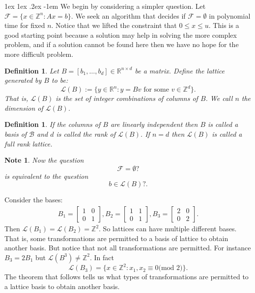 \documentclass[11pt]{article}
\makeatletter
\renewcommand\paragraph{\@startsection{paragraph}{4}{0mm}%
                                    {1ex \@plus1ex \@minus.2ex}%
                                    {-1em}%
                                    {\normalfont\normalsize\bfseries}}
\newtheorem{definition}[fact]{Definition}
\newtheorem{note}[fact]{Note}
\newcommand{\R}{\ensuremath{\mathbb R}}
\newcommand{\Z}{\ensuremath{\mathbb Z}}
\makeatother
\begin{document}
\paragraph{}
We begin by considering a simpler question. Let $\mathcal{F} = \{x \in \Z^n: Ax=b \}$. We seek an algorithm that decides if $\mathcal{F} = \emptyset$ in polynomial time for fixed $n$. Notice that we lifted the constraint that $0 \leq x \leq u$. This is a good starting point because a solution may help in solving the more complex problem, and if a solution cannot be found here then we have no hope for the more difficult problem.
\begin{definition}
Let $B = [b_1,\dots,b_d] \in \R^{n \times d}$ be a matrix. Define the lattice generated by $B$ to be:
$$\mathcal{L}(B) := \{y \in \R^n : y = Bv \text{ for some } v \in \Z^d \}.$$
That is, $\mathcal{L}(B)$ is the set of integer combinations of columns of $B$. We call $n$ the dimension of $\mathcal{L}(B)$.
\end{definition}
\begin{definition}
If the columns of $B$ are linearly independent then $B$ is called a basis of $\mathcal{B}$ and $d$ is called the rank of $\mathcal{L}(B)$. If $n=d$ then $\mathcal{L}(B)$ is called a full rank lattice.
\end{definition}
\begin{note}
Now the question $$\mathcal{F} = \emptyset?$$ is equivalent to the question $$b \in \mathcal{L}(B)?.$$ 
\end{note}
\begin{example}
Consider the bases:
\begin{align*}
B_1 = \begin{bmatrix} 1 & 0 \\ 0 & 1 \end{bmatrix},
B_2 = \begin{bmatrix} 1 & 1 \\ 0 & 1 \end{bmatrix},
B_3 = \begin{bmatrix} 2 & 0 \\ 0 & 2 \end{bmatrix}.
\end{align*}
Then $\mathcal{L}(B_1) = \mathcal{L}(B_2) = \Z^2$. So lattices can have multiple different bases. That is, some transformations are permitted to a basis of lattice to obtain another basis. But notice that not all transformations are permitted. For instance $B_3 = 2B_1$ but $\mathcal{L}(B^3) \neq \Z^2$. In fact $$\mathcal{L}(B_3) = \{x \in \Z^2: x_1,x_2 \equiv 0 \text{(mod $2$)} \}.$$
The theorem that follows tells us what types of transformations are permitted to a lattice basis to obtain another basis.
\end{example}
\end{document}
